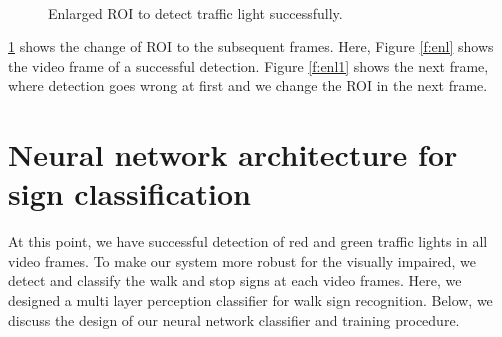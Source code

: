 \begin{figure}[!ht]
\centering
{}\\
\caption{Enlarged ROI to detect traffic light successfully.}
\label{f:rec_enl}
\end{figure}

\ref{f:rec_enl} shows the change of ROI to the subsequent frames.
Here, Figure \ref{f:enl} shows the video frame of a successful detection.
Figure \ref{f:enl1} shows the next frame, where detection goes wrong at first and we change the ROI in the next frame.

\section{Neural network architecture for sign classification}
At this point, we have successful detection of red and green traffic lights in all video frames.
To make our system more robust for the visually impaired, we detect and classify the walk and stop signs at each video frames.
Here, we designed a multi layer perception classifier for walk sign recognition.
Below, we discuss the design of our neural network classifier and training procedure. 

